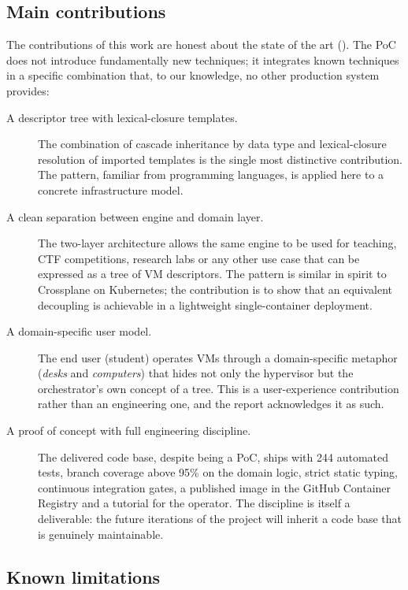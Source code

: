 \subsection{Main contributions}

The contributions of this work are honest about the state of the
art (). The PoC does not introduce
fundamentally new techniques; it integrates known techniques in a
specific combination that, to our knowledge, no other production
system provides:

\begin{description}
  \item[A descriptor tree with lexical-closure templates.]
        The combination of cascade inheritance by data type and
        lexical-closure resolution of imported templates is the
        single most distinctive contribution. The pattern, familiar
        from programming languages, is applied here to a concrete
        infrastructure model.
  \item[A clean separation between engine and domain layer.]
        The two-layer architecture allows the same engine to be
        used for teaching, CTF competitions, research labs or any
        other use case that can be expressed as a tree of VM
        descriptors. The pattern is similar in spirit to
        Crossplane on Kubernetes; the contribution is to show that
        an equivalent decoupling is achievable in a lightweight
        single-container deployment.
  \item[A domain-specific user model.]
        The end user (student) operates VMs through a
        domain-specific metaphor (\emph{desks} and
        \emph{computers}) that hides not only the hypervisor but the
        orchestrator's own concept of a tree. This is a
        user-experience contribution rather than an engineering one,
        and the report acknowledges it as such.
  \item[A proof of concept with full engineering discipline.]
        The delivered code base, despite being a PoC, ships with
        244 automated tests, branch coverage above 95\% on the
        domain logic, strict static typing, continuous integration
        gates, a published image in the GitHub Container Registry
        and a tutorial for the operator. The discipline is itself a
        deliverable: the future iterations of the project will
        inherit a code base that is genuinely maintainable.
\end{description}

\subsection{Known limitations}


